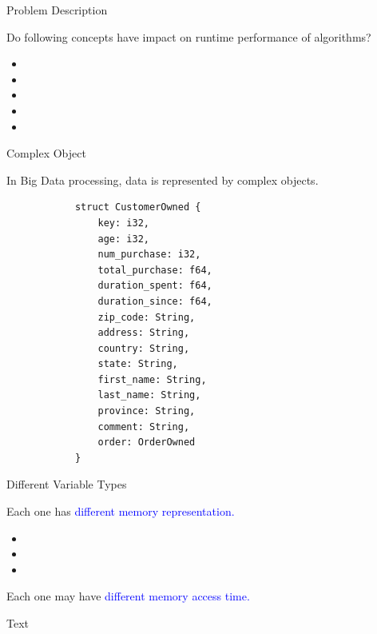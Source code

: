 \documentclass[9pt]{beamer}
\begin{document}

\begin{frame}[fragile]{Problem Description}


    Do following concepts have impact on runtime performance of algorithms?
    \begin{itemize}
        \item {}
        \item {}
        \item {}
        \item {}
        \item {}
    \end{itemize}
\end{frame}


\begin{frame}[fragile]{Complex Object}

    In Big Data processing, data is represented by complex objects.

    \begin{minipage}[t]{0.2\linewidth}\centering
        \begin{lstlisting}
            struct CustomerOwned {
                key: i32,
                age: i32,
                num_purchase: i32,
                total_purchase: f64,
                duration_spent: f64,
                duration_since: f64,
                zip_code: String,
                address: String,
                country: String,
                state: String,
                first_name: String,
                last_name: String,
                province: String,
                comment: String,
                order: OrderOwned
            }
        \end{lstlisting}
    \end{minipage}\hfill

\end{frame}

\begin{frame}[t, fragile]{Different Variable Types}

    Each one has \textcolor{blue}{different memory representation.}
    \begin{itemize}
        \item {}
        \item {}
        \item {}
    \end{itemize}

    Each one may have \textcolor{blue}{different memory access time.}

\pause


Text



\end{frame}
\end{document}
